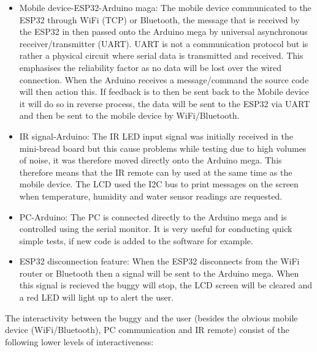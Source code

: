 \documentclass[8pt, a4paper]{article}
\begin{document}
\begin{itemize}
	\item Mobile device-ESP32-Arduino maga: The mobile device communicated to the ESP32 through WiFi (TCP) or Bluetooth, the message that is received by the ESP32 in then passed onto the Arduino mega by universal asynchronous receiver/transmitter (UART). UART is not a communication protocol but is rather a physical circuit where serial data is transmitted and received. This emphasises the reliability factor as no data will be lost over the wired connection. When the Arduino receives a message/command the source code will then action this. If feedback is to then be sent back to the Mobile device it will do so in reverse process, the data will be sent to the ESP32 via UART and then be sent to the mobile device by WiFi/Bluetooth. 
	\item IR signal-Arduino: The IR LED input signal was initially received in the mini-bread board but this cause problems while testing due to high volumes of noise, it was therefore moved directly onto the Arduino mega. This therefore means that the IR remote can by used at the same time as the mobile device. The LCD used the I2C bus to print messages on the screen when temperature, humidity and water sensor readings are requested. 
	\item  PC-Arduino: The PC is connected directly to the Arduino mega and is controlled using the serial monitor. It is very useful for conducting quick simple tests, if new code is added to the software for example. 
	\item ESP32 disconnection feature: When the ESP32 disconnects from the WiFi router or Bluetooth then a signal will be sent to the Arduino mega. When this signal is recieved the buggy will stop, the LCD screen will be cleared and a red LED will light up to alert the user. 
\end{itemize} 

The interactivity between the buggy and the user (besides the obvious mobile device (WiFi/Bluetooth), PC communication and IR remote) consist of the following lower levels of interactiveness:
\end{document}

